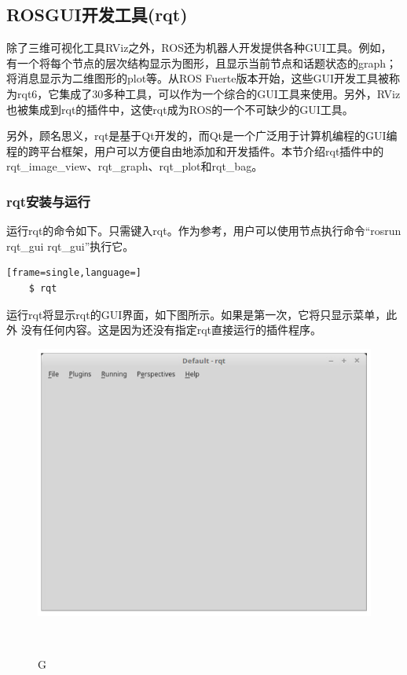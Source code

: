 \documentclass[geye,green,kindle,cn]{elegantnote}
\begin{document}
\subsection{ROSGUI开发工具(rqt)}
除了三维可视化工具RViz之外，ROS还为机器人开发提供各种GUI工具。例如，有一个将每个节点的层次结构显示为图形，且显示当前节点和话题状态的graph；将消息显示为二维图形的plot等。从ROS Fuerte版本开始，这些GUI开发工具被称为rqt6，它集成了30多种工具，可以作为一个综合的GUI工具来使用。另外，RViz也被集成到rqt的插件中，这使rqt成为ROS的一个不可缺少的GUI工具。

另外，顾名思义，rqt是基于Qt开发的，而Qt是一个广泛用于计算机编程的GUI编程的跨平台框架，用户可以方便自由地添加和开发插件。本节介绍rqt插件中的rqt\_image\_view、rqt\_graph、rqt\_plot和rqt\_bag。 
\subsubsection{rqt安装与运行}
运行rqt的命令如下。只需键入rqt。作为参考，用户可以使用节点执行命令“rosrun rqt\_gui rqt\_gui”执行它。 
\begin{lstlisting}[frame=single,language=]
    $ rqt
\end{lstlisting}

运行rqt将显示rqt的GUI界面，如下图所示。如果是第一次，它将只显示菜单，此外 没有任何内容。这是因为还没有指定rqt直接运行的插件程序。
\begin{figure}[htbp]
    \centering
    \includegraphics[width=1\linewidth]{src/G.png}
    \centering
    \caption{G} \label{picture:G}
\end{figure}
\end{document}

